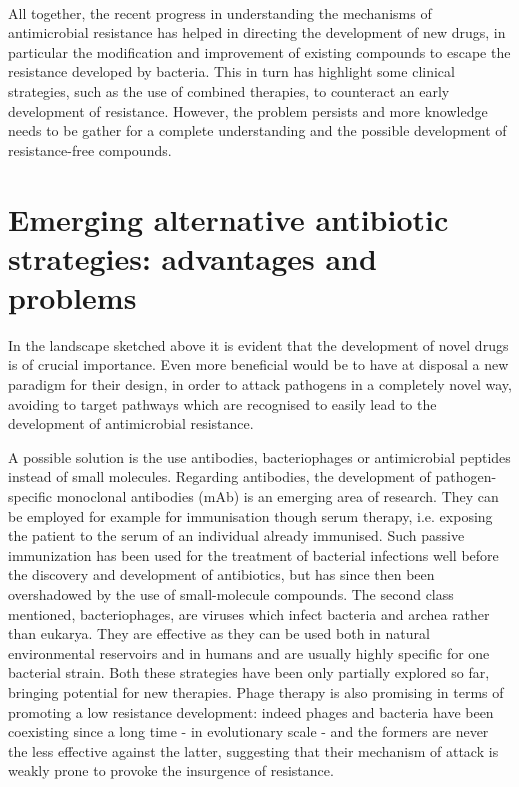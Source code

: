 \documentclass[a4paper,11pt]{extreport}
\begin{document}
\hspace{0.5cm}
\\
All together, the recent progress in understanding the mechanisms of antimicrobial resistance has helped in directing the development of new drugs, in particular the modification and improvement of existing compounds to escape the resistance developed by bacteria. This in turn has highlight some clinical strategies, such as the use of combined therapies, to counteract an early development of resistance. However, the problem persists and more knowledge needs to be gather for a complete understanding and the possible development of resistance-free compounds.


\section{Emerging alternative antibiotic strategies: advantages and problems}

In the landscape sketched above it is evident that the development of novel drugs is of crucial importance. Even more beneficial would be to have at disposal a new paradigm for their design, in order to attack pathogens in a completely novel way, avoiding to target pathways which are recognised to easily lead to the development of antimicrobial resistance.

A possible solution is the use antibodies, bacteriophages or antimicrobial peptides instead of small molecules.\cite{Mantravadi2019}
%
Regarding antibodies, the development of pathogen-specific monoclonal antibodies (mAb) is an emerging area of research. They can be employed for example for immunisation though serum therapy, i.e. exposing the patient to the serum of an individual already immunised. Such passive immunization has been used for the treatment of bacterial infections well before the discovery and development of antibiotics, but has since then been overshadowed by the use of small-molecule compounds.
%
The second class mentioned, bacteriophages, are viruses which infect bacteria and archea rather than eukarya. They are effective as they can be used both in natural environmental reservoirs and in humans and are usually highly specific for one bacterial strain.
%
Both these strategies have been only partially explored so far, bringing potential for new therapies. Phage therapy is also promising in terms of promoting a low resistance development: indeed phages and bacteria have been coexisting since a long time - in evolutionary scale - and the formers are never the less effective against the latter, suggesting that their mechanism of attack is weakly prone to provoke the insurgence of resistance.
\end{document}

